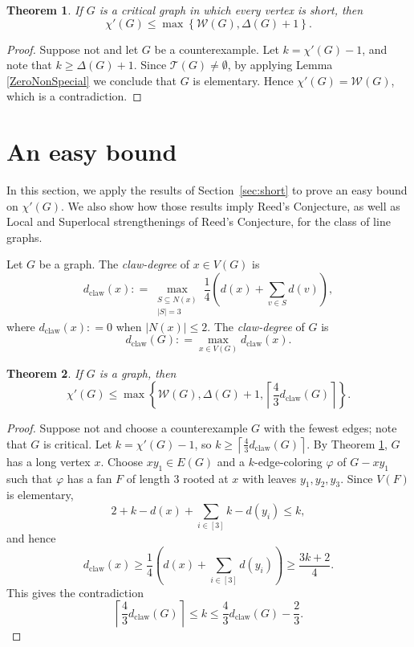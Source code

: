 \documentclass[12pt]{amsart}
\theoremstyle{plain}
\newtheorem{thm}{Theorem}
\theoremstyle{definition}
\theoremstyle{remark}
\newcommand{\fancy}[1]{\mathcal{#1}}
\newcommand{\W}{\fancy{W}}
\newcommand{\T}{\fancy{T}}
\newcommand{\set}[1]{\left\{ #1 \right\}}
\newcommand{\card}[1]{\left|#1\right|}
\newcommand{\ceil}[1]{\left\lceil#1\right\rceil}
\newcommand{\irange}[1]{\left[#1\right]}
\newcommand{\parens}[1]{\left( #1 \right)}
\newcommand{\DefinedAs}{\mathrel{\mathop:}=}
\newcommand{\dclaw}[1]{d_{\text{claw}}\left( #1 \right)}
\newcommand{\vph}{\varphi}
\def\aftermath{\par\vspace{-\belowdisplayskip}\vspace{-\parskip}\vspace{-\baselineskip}}
\begin{document}
\begin{thm}\label{AllSpecialImpliesElementary}
If $G$ is a critical graph in which every vertex is short, then
\[\chi'(G) \le \max \set{\W(G), \Delta(G) + 1}.\]
\end{thm}
\begin{proof}
Suppose not and let $G$ be a counterexample. %
Let $k = \chi'(G) - 1$, and note that $k \ge \Delta(G) + 1$.  
Since $\T(G) \ne \emptyset$, by applying Lemma \ref{ZeroNonSpecial} we conclude
that $G$ is elementary.  Hence $\chi'(G) = \W(G)$, which is a
contradiction.
\end{proof}

\section{An easy bound}
In this section, we apply the results of Section~\ref{sec:short} to prove an
easy bound on $\chi'(G)$.  We also show how those results imply Reed's Conjecture, as
well as Local and Superlocal strengthenings of Reed's Conjecture, for the class
of line graphs.

Let $G$ be a graph.  The \emph{claw-degree} of $x \in V(G)$ is 
\[\dclaw{x} \DefinedAs \max_{\substack{S \subseteq N(x) \\ \card{S} = 3}}\frac14 \parens{d(x) + \sum_{v \in S} d(v)},\]
where $\dclaw{x} \DefinedAs 0$ when $|N(x)| \le 2$.
The \emph{claw-degree} of $G$ is 
\[\dclaw{G} \DefinedAs \max_{x \in V(G)} \dclaw{x}.\]
\begin{thm}
\label{EasyBound}
If $G$ is a graph, then
\[\chi'(G) \le \max\set{\W(G), \Delta(G) + 1, \ceil{\frac43\dclaw{G}}}.\]
\end{thm}
\begin{proof}
Suppose not and choose a counterexample $G$ with the fewest edges; note that $G$
is critical. 
Let $k=\chi'(G)-1$, so $k \ge \ceil{\frac43\dclaw{G}}$. 
By Theorem \ref{AllSpecialImpliesElementary}, $G$ has a long vertex $x$.
Choose $xy_1 \in E(G)$ and a $k$-edge-coloring $\vph$ of $G - xy_1$ such that
$\vph$ has a fan $F$ of length $3$ rooted at $x$ with leaves $y_1, y_2, y_3$.  
Since $V(F)$ is elementary, 
\[2 + k - d(x) + \sum_{i \in \irange{3}} k-d(y_i) \le k,\]
and hence
\[\dclaw{x} \ge \frac14\parens{d(x) + \sum_{i \in \irange{3}} d(y_i)} \ge \frac{3k+2}{4}.\]
This gives the contradiction
\[\ceil{\frac43\dclaw{G}} \le k \le \frac43\dclaw{G} - \frac23.\]
\aftermath
\end{proof}
\end{document}

